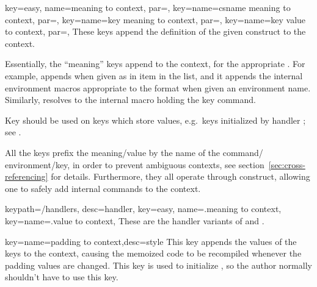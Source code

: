 \documentclass[a4paper,11pt]{article}
\begin{document}
\begin{doc}{
    key={easy, name=meaning to context,
      par=},
    key={name=csname meaning to context, par=},
    key={name=key meaning to context,
      par=},
    key={name=key value to context,
      par=},
  }
  These keys append the definition of the given construct to the context.

  Essentially, the ``meaning'' keys append 
  to the context, for the appropriate .  For example,
   appends  when given 
  as in item in the list, and it appends the internal environment macros
  appropriate to the format when given an environment name.  Similarly,
   resolves  to the
  internal macro holding the key command.

  Key  should be used on keys which store values,
  e.g.\ keys initialized by  handler ; see
  .

  All the keys prefix the meaning\slash value by the name of the command\slash
  environment\slash key, in order to prevent ambiguous contexts, see
  section~\ref{sec:cross-referencing} for details.  Furthermore, they all
  operate through  construct, allowing one
  to safely add internal commands to the context.
\end{doc}

\begin{doc}{
    keypath={/handlers, desc=handler},
    key={easy, name=.meaning to context},
    key={name=.value to context},
  }
  These are the handler variants of  and
  .
\end{doc}


\begin{doc}{key={name=padding to context,desc=style}}
  This key appends the values of the  keys to the context,
  causing the memoized code to be recompiled whenever the padding values are
  changed.  This key is used to initialize , so the author
  normally shouldn't have to use this key.
\end{doc}
\end{document}
